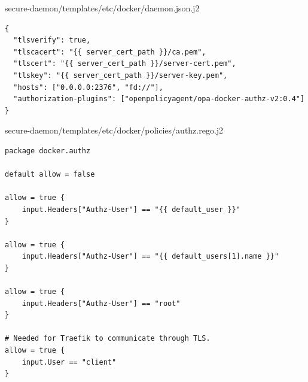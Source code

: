 secure-daemon/templates/etc/docker/daemon.json.j2
\begin{verbatim}
{
  "tlsverify": true,
  "tlscacert": "{{ server_cert_path }}/ca.pem",
  "tlscert": "{{ server_cert_path }}/server-cert.pem",
  "tlskey": "{{ server_cert_path }}/server-key.pem",
  "hosts": ["0.0.0.0:2376", "fd://"],
  "authorization-plugins": ["openpolicyagent/opa-docker-authz-v2:0.4"]
}
\end{verbatim}


secure-daemon/templates/etc/docker/policies/authz.rego.j2
\begin{verbatim}
package docker.authz

default allow = false

allow = true {
    input.Headers["Authz-User"] == "{{ default_user }}"
}

allow = true {
    input.Headers["Authz-User"] == "{{ default_users[1].name }}"
}

allow = true {
    input.Headers["Authz-User"] == "root"
}

# Needed for Traefik to communicate through TLS.
allow = true {
    input.User == "client"
}
\end{verbatim}

